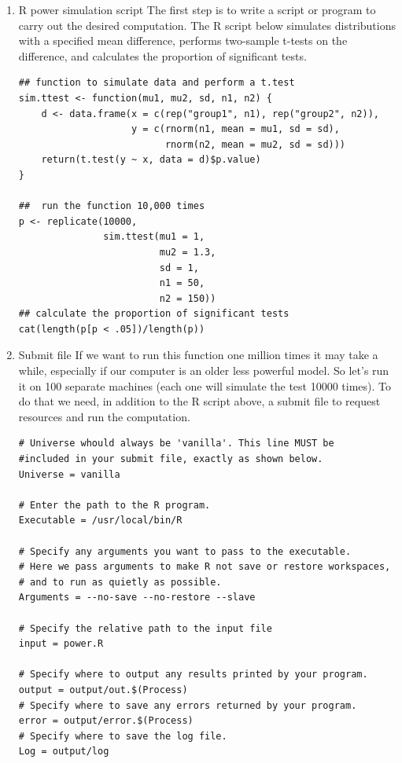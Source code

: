 \documentclass[11pt]{article}
\begin{document}
\begin{enumerate}
\item R power simulation script
\label{sec:orgbbfb2e6}
The first step is to write a script or program to carry out the desired computation. The R script below simulates distributions with a specified mean difference, performs two-sample t-tests on the difference, and calculates the proportion of significant tests.
\begin{verbatim}
## function to simulate data and perform a t.test
sim.ttest <- function(mu1, mu2, sd, n1, n2) {
    d <- data.frame(x = c(rep("group1", n1), rep("group2", n2)),
                    y = c(rnorm(n1, mean = mu1, sd = sd),
                          rnorm(n2, mean = mu2, sd = sd)))
    return(t.test(y ~ x, data = d)$p.value)
}

##  run the function 10,000 times 
p <- replicate(10000,
               sim.ttest(mu1 = 1,
                         mu2 = 1.3,
                         sd = 1,
                         n1 = 50,
                         n2 = 150))
## calculate the proportion of significant tests
cat(length(p[p < .05])/length(p))
\end{verbatim}

\item Submit file
\label{sec:org9e546de}
If we want to run this function one million times it may take a while, especially if our computer is an older less powerful model. So let's run it on 100 separate machines (each one will simulate the test 10000 times). To do that we need, in addition to the R script above, a submit file to request resources and run the computation.  
\begin{verbatim}
# Universe whould always be 'vanilla'. This line MUST be 
#included in your submit file, exactly as shown below.
Universe = vanilla

# Enter the path to the R program.
Executable = /usr/local/bin/R

# Specify any arguments you want to pass to the executable.
# Here we pass arguments to make R not save or restore workspaces,
# and to run as quietly as possible.
Arguments = --no-save --no-restore --slave

# Specify the relative path to the input file
input = power.R

# Specify where to output any results printed by your program.
output = output/out.$(Process)
# Specify where to save any errors returned by your program.
error = output/error.$(Process)
# Specify where to save the log file.
Log = output/log


\end{verbatim}
\end{enumerate}
\end{document}
